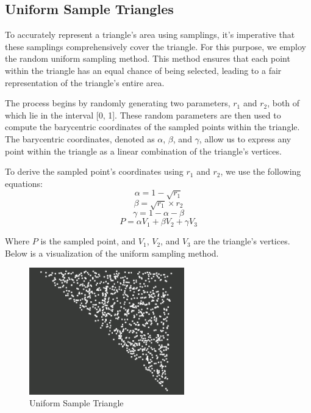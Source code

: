 \documentclass[11pt, a4paper,oneside,chapterprefix=false]{scrbook}
\begin{document}
\subsection{Uniform Sample Triangles}

To accurately represent a triangle's area using samplings, it's imperative that these samplings comprehensively cover the triangle. For this purpose, we employ the random uniform sampling method. This method ensures that each point within the triangle has an equal chance of being selected, leading to a fair representation of the triangle's entire area.

The process begins by randomly generating two parameters, \( r_1 \) and \( r_2 \), both of which lie in the interval [0, 1]. These random parameters are then used to compute the barycentric coordinates of the sampled points within the triangle. The barycentric coordinates, denoted as \( \alpha \), \( \beta \), and \( \gamma \), allow us to express any point within the triangle as a linear combination of the triangle's vertices.

To derive the sampled point's coordinates using \( r_1 \) and \( r_2 \), we use the following equations:
\[ \alpha = 1 - \sqrt{r_1} \]
\[ \beta = \sqrt{r_1} \times r_2 \]
\[ \gamma = 1 - \alpha - \beta \]
\[ P = \alpha V_1 + \beta V_2 + \gamma V_3 \]

Where \( P \) is the sampled point, and \( V_1 \), \( V_2 \), and \( V_3 \) are the triangle's vertices. Below is a visualization of the uniform sampling method.

\begin{minipage}{\textwidth}
	\begin{figure}[H]
		\centering
		\includegraphics*[width=0.6\textwidth]{figures/uniform sample triangle.png}
		\caption{Uniform Sample Triangle}
		\label{fig:uniform sample triangle}
	\end{figure}
\end{minipage}
\end{document}
